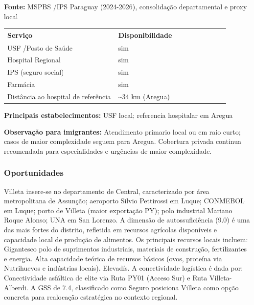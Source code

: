 \textbf{Fonte:} MSPBS /\allowbreak  IPS Paraguay (2024-2026), consolidação
departamental e proxy local

{\def\LTcaptype{none} %
\begin{longtable}{@{}>{\raggedright\arraybackslash}p{0.45\linewidth} >{\raggedright\arraybackslash}p{0.45\linewidth}@{}}
\toprule\noalign{}
Serviço & Disponibilidade \\
\midrule\noalign{}
\endhead
\bottomrule\noalign{}
\endlastfoot
USF /\allowbreak  Posto de Saúde & sim \\
Hospital Regional & sim \\
IPS (seguro social) & sim \\
Farmácia & sim \\
Distância ao hospital de referência & \textasciitilde34 km (Aregua) \\
\end{longtable}
}

\textbf{Principais estabelecimentos:} USF local; referencia hospitalar
em Aregua

\textbf{Observação para imigrantes:} Atendimento primario local ou em
raio curto; casos de maior complexidade seguem para Aregua. Cobertura
privada continua recomendada para especialidades e urgências de maior
complexidade.
\newpage

\subsubsection*{Oportunidades}\label{oport-villeta-1116}
Villeta insere-se no departamento de Central, caracterizado por área metropolitana de Assunção; aeroporto Silvio Pettirossi em Luque; CONMEBOL em Luque; porto de Villeta (maior exportação PY); polo industrial Mariano Roque Alonso; UNA em San Lorenzo. A dimensão de autossuficiência (9.0) é uma das mais fortes do distrito, refletida em recursos agrícolas disponíveis e capacidade local de produção de alimentos. Os principais recursos locais incluem: Gigantesco polo de suprimentos industriais, materiais de construção, fertilizantes e energia. Alta capacidade teórica de recursos básicos (ovos, proteína via Nutrihuevos e indústrias locais). Elevadís. A conectividade logística é dada por: Conectividade asfáltica de elite via Ruta PY01 (Acceso Sur) e Ruta Villeta-Alberdi. A GSS de 7.4, classificado como Seguro posiciona Villeta como opção concreta para realocação estratégica no contexto regional.

